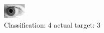 \begin{figure}[h!]
\begin{center}
\includegraphics[width=0.60\columnwidth]{figures/ID244_class_4_target_3.png}
\end{center}
\caption{ Classification: 4 actual target: 3}
\label{fig:ID244_class_4_target_3}
\end{figure}
